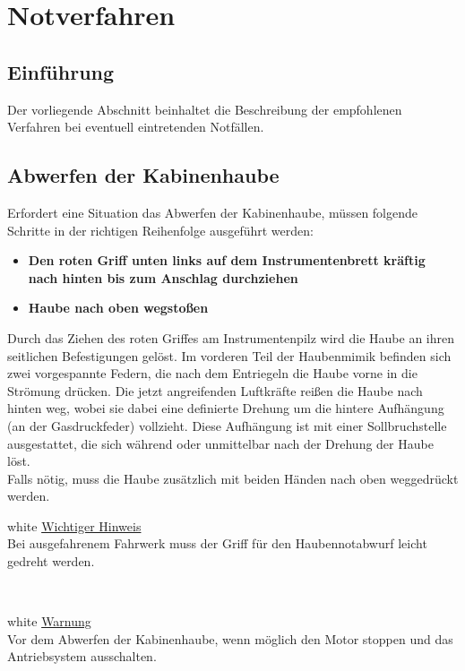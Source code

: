 \chapter{Notverfahren}
\pagecolor{red}
\section{Einführung}
Der vorliegende Abschnitt beinhaltet die Beschreibung der empfohlenen Verfahren bei eventuell eintretenden Notfällen.

\section{Abwerfen der Kabinenhaube}
Erfordert eine Situation das Abwerfen der Kabinenhaube, müssen folgende Schritte in der richtigen Reihenfolge ausgeführt werden:
\begin{itemize}
\item \textbf{Den roten Griff unten links auf dem Instrumentenbrett kräftig nach hinten bis zum Anschlag durchziehen}
\item \textbf{Haube nach oben wegstoßen}
\end{itemize}

Durch das Ziehen des roten Griffes am Instrumentenpilz wird die Haube an ihren seitlichen Befestigungen gelöst. Im vorderen Teil der Haubenmimik befinden sich zwei vorgespannte Federn, die nach dem Entriegeln die Haube vorne in die Strömung drücken. Die jetzt angreifenden Luftkräfte reißen die Haube nach hinten weg, wobei sie dabei eine definierte Drehung um die hintere Aufhängung (an der Gasdruckfeder) vollzieht. Diese Aufhängung ist mit einer Sollbruchstelle ausgestattet, die sich während oder unmittelbar nach der Drehung der Haube löst.\\
Falls nötig, muss die Haube zusätzlich mit beiden Händen nach oben weggedrückt werden.\\
\newline
\newline
\begin{color}{white}
\large{\underline{Wichtiger Hinweis}}\\
Bei ausgefahrenem Fahrwerk muss der Griff für den Haubennotabwurf leicht gedreht werden.
\end{color}\\

\begin{color}{white}
\large{\underline{Warnung}}\\
Vor dem Abwerfen der Kabinenhaube, wenn möglich den Motor
stoppen und das Antriebsystem ausschalten.
\end{color}

